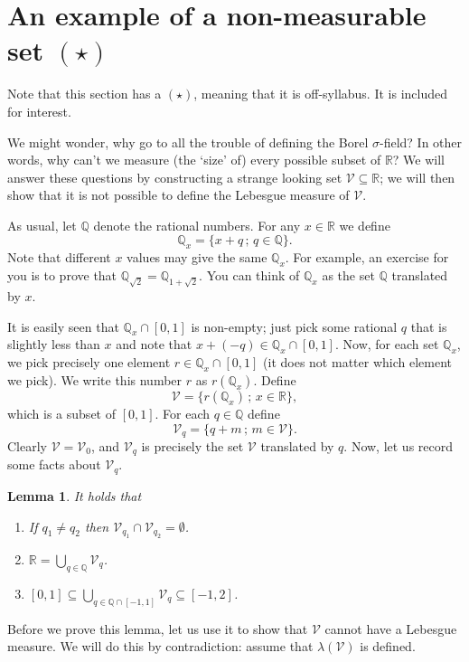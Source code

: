 \documentclass[a4paper]{report}
\newcounter{thm_counter}[chapter]
\newtheorem{lemma}[thm_counter]{Lemma}
\numberwithin{equation}{chapter}
\numberwithin{thm_counter}{section}
\def\sw{\subseteq} %
\def\mb{\mathbb} %
\def\R{\mb{R}} %
\def\Q{\mb{Q}}
\def\-{\,;\,} %
\begin{document}
\newpage
\section{An example of a non-measurable set $(\star)$}
\label{sec:non_meas_set}

Note that this section has a $(\star)$, meaning that it is off-syllabus. 
It is included for interest.

We might wonder, why go to all the trouble of defining the Borel $\sigma$-field? 
In other words, why can't we measure (the `size' of) every possible subset of $\R$? 
We will answer these questions by constructing a strange looking set $\mathscr{V}\sw\R$; 
we will then show that it is not possible to define the Lebesgue measure of $\mathscr{V}$.

As usual, let $\Q$ denote the rational numbers.
For any $x\in\R$ we define
\begin{equation}
\label{eq:Qx_def}
\Q_x=\{x+q\-q\in\Q\}.
\end{equation}
Note that different $x$ values may give the same $\Q_x$. For example, an exercise for you is to prove that $\Q_{\sqrt{2}}=\Q_{1+\sqrt{2}}$. You can think of $\Q_x$ as the set $\Q$ translated by $x$.

It is easily seen that $\Q_x\cap[0,1]$ is non-empty; just pick some rational $q$ that is slightly less than $x$ and note that
$x+(-q)\in\Q_x\cap[0,1]$. Now, for each set $\Q_x$, we pick precisely one element $r\in\Q_x\cap[0,1]$ (it does not matter which element we pick).
We write this number $r$ as $r(\Q_x)$.
Define
$$\mathscr{V}=\{r(\Q_x)\-x\in\mathbb{R}\},$$
which is a subset of $[0,1]$.
For each $q\in\Q$ define
$$\mathscr{V}_q=\{q+m\-m\in\mathscr{V}\}.$$
Clearly $\mathscr{V}=\mathscr{V}_0$, and $\mathscr{V}_q$ is precisely the set $\mathscr{V}$ translated by $q$.
Now, let us record some facts about $\mathscr{V}_q$.

\begin{lemma}
\label{lem:non_meas_pre}
It holds that
\begin{enumerate}
\item If $q_1\neq q_2$ then $\mathscr{V}_{q_1}\cap \mathscr{V}_{q_2}=\emptyset$.
\item $\R=\bigcup_{q\in\Q} \mathscr{V}_q$.
\item $[0,1]\sw \bigcup_{q\in\Q\cap[-1,1]} \mathscr{V}_q\sw[-1,2]$.
\end{enumerate}
\end{lemma}
Before we prove this lemma, let us use it to show that $\mathscr{V}$ cannot have a Lebesgue measure.
We will do this by contradiction: assume that $\lambda(\mathscr{V})$ is defined.
\end{document}
